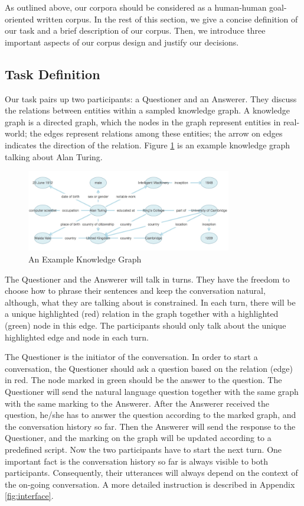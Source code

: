\documentclass[bsc,frontabs,twoside,singlespacing,parskip,deptreport]{infthesis}     %
\begin{document}
As outlined above, our corpora should be considered as a human-human goal-oriented written corpus. In the rest of this section, we give a concise definition of our task and a brief description of our corpus. Then, we introduce three important aspects of our corpus design and justify our decisions.

\subsection{Task Definition}

Our task pairs up two participants: a Questioner and an Answerer. They discuss the relations between entities within a sampled knowledge graph. A knowledge graph is a directed graph, which the nodes in the graph represent entities in real-world; the edges represent relations among these entities; the arrow on edges indicates the direction of the relation. Figure \ref{fig:kg} is an example knowledge graph talking about Alan Turing. 

\begin{figure}[h]
    \centering
    \includegraphics[width=0.80\textwidth]{kg.png}
    \caption{An Example Knowledge Graph}
    \label{fig:kg}
\end{figure}


The Questioner and the Answerer will talk in turns. They have the freedom to choose how to phrase their sentences and keep the conversation natural, although, what they are talking about is constrained. In each turn, there will be a unique highlighted (red) relation in the graph together with a highlighted (green) node in this edge. The participants should only talk about the unique highlighted edge and node in each turn.

The Questioner is the initiator of the conversation. In order to start a conversation, the Questioner should ask a question based on the relation (edge) in red. The node marked in green should be the answer to the question. The Questioner will send the natural language question together with the same graph with the same marking to the Answerer. After the Answerer received the question, he/she has to answer the question according to the marked graph, and the conversation history so far. Then the Answerer will send the response to the Questioner, and the marking on the graph will be updated according to a predefined script. Now the two participants have to start the next turn. One important fact is the conversation history so far is always visible to both participants. Consequently, their utterances will always depend on the context of the on-going conversation. A more detailed instruction is described in Appendix \ref{fig:interface}.
\end{document}
